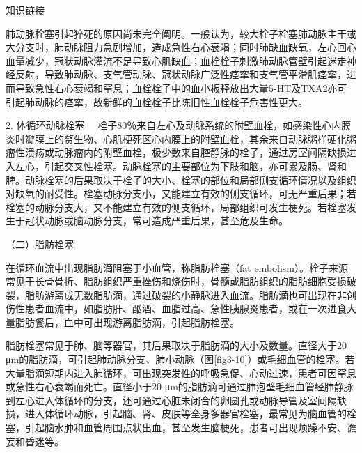 {知识链接}

肺动脉栓塞引起猝死的原因尚未完全阐明。一般认为，较大栓子栓塞肺动脉主干或大分支时，肺动脉阻力急剧增加，造成急性右心衰竭；同时肺缺血缺氧，左心回心血量减少，冠状动脉灌流不足导致心肌缺血；血栓栓子刺激肺动脉管壁引起迷走神经反射，导致肺动脉、支气管动脉、冠状动脉广泛性痉挛和支气管平滑肌痉挛，进而导致急性右心衰竭和窒息；血栓栓子中的血小板释放出大量5-HT及TXA2亦可引起肺动脉的痉挛，故新鲜的血栓栓子比陈旧性血栓栓子危害性更大。

{2. 体循环动脉栓塞}
　栓子80％来自左心及动脉系统的附壁血栓，如感染性心内膜炎时瓣膜上的赘生物、心肌梗死区心内膜上的附壁血栓，其余来自动脉粥样硬化粥瘤性溃疡或动脉瘤内的附壁血栓，极少数来自腔静脉的栓子，通过房室间隔缺损进入左心，引起交叉性栓塞。动脉栓塞的主要部位为下肢和脑，亦可累及肠、肾和脾。动脉栓塞的后果取决于栓子的大小、栓塞的部位和局部侧支循环情况以及组织对缺氧的耐受性。栓塞动脉分支小，又能建立有效的侧支循环，可无严重后果；若栓塞的动脉分支大，又不能建立有效的侧支循环，局部组织可发生梗死。若栓塞发生于冠状动脉或脑动脉分支，常可造成严重后果，甚至危及生命。

{（二）脂肪栓塞}

在循环血流中出现脂肪滴阻塞于小血管，称脂肪栓塞（fat
embolism）。栓子来源常见于长骨骨折、脂肪组织严重挫伤和烧伤时，骨髓或脂肪组织的脂肪细胞受损破裂，脂肪游离成无数脂肪滴，通过破裂的小静脉进入血流。脂肪滴也可出现在非创伤性患者血流中，如脂肪肝、酗酒、血脂过高、急性胰腺炎患者，或在一次进食大量脂肪餐后，血中可出现游离脂肪滴，引起脂肪栓塞。

脂肪栓塞常见于肺、脑等器官，其后果取决于脂肪滴的大小及数量。直径大于20
μm的脂肪滴，可引起肺动脉分支、肺小动脉（图\ref{fig3-10}）或毛细血管的栓塞。若大量脂滴短期内进入肺循环，可出现突发性的呼吸急促、心动过速，患者可因窒息或急性右心衰竭而死亡。直径小于20
μm的脂肪滴可通过肺泡壁毛细血管经肺静脉到左心进入体循环的分支，还可通过心脏未闭合的卵圆孔或动脉导管及室间隔缺损，进入体循环动脉，引起脑、肾、皮肤等全身多器官栓塞，最常见为脑血管的栓塞，引起脑水肿和血管周围点状出血，甚至发生脑梗死，患者可出现烦躁不安、谵妄和昏迷等。

